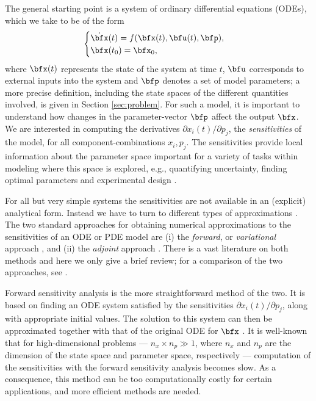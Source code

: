 \documentclass[DIV=12]{scrartcl} %
\theoremstyle{definition}
\begin{document}
The general starting point is a system of ordinary differential equations (ODEs), which we take to be of the form
\begin{equation*}
\begin{cases}
\dot{\bfx}(t) = f(\bfx(t),\bfu(t),\bfp),\\
\bfx(t_0) = \bfx_0,
\end{cases}    
\end{equation*}
where $\bfx(t)$ represents the state of the system at time $t$, $\bfu$ corresponds to external inputs into the system and $\bfp$ denotes a set of model parameters; a more precise definition, including the state spaces of the different quantities involved, is given in Section \ref{sec:problem}. 
For such a model, it is important to understand how changes in the parameter-vector $\bfp$ affect the output $\bfx$. We are interested in computing the derivatives $\partial x_i (t) / \partial p_j$, the \textit{sensitivities} of the model, for all component-combinations $x_i, p_j$. The sensitivities provide local information about the parameter space important for a variety of tasks within modeling where this space is explored,
e.g., quantifying uncertainty, finding optimal parameters and experimental design \cite{CS85, Cacuci03, CIBN05, CE17}. 

For all but very simple systems the sensitivities are not available in an (explicit) analytical form. Instead we have to turn to different types of approximations \cite{Cacuci03, CIBN05}. The two standard approaches for obtaining numerical approximations to the sensitivities of an ODE or PDE model are (i) the \textit{forward}, or \textit{variational} approach \cite{CS85, Cacuci03}, and (ii) the \textit{adjoint} approach \cite{Marchuk95, MAS96, CLPR03}. There is a vast literature on both methods and here we only give a brief review; for a comparison of the two approaches, see \cite{CE17}.

Forward sensitivity analysis is the more straightforward method of the two. It is based on finding an ODE system satisfied by the sensitivities $\partial x_i (t) / \partial p_j$, along with appropriate initial values. The solution to this system can then be approximated together with that of the original ODE for $\bfx$ \cite{Cacuci03, CE17}. It is well-known that for high-dimensional problems — $n_x\times n_p\gg 1$, where $n_x$ and $n_p$ are the dimension of the state space and parameter space, respectively — computation of the sensitivities with the forward sensitivity analysis becomes slow. As a consequence, this method can be too computationally costly for certain applications, and more efficient methods are needed.
\end{document}

